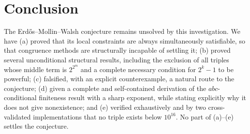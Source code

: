 \documentclass[11pt]{article}
\theoremstyle{definition}
\begin{document}
\section{Conclusion}

The Erdős--Mollin--Walsh conjecture remains unsolved by this investigation. We have
(a) proved that its local constraints are always simultaneously satisfiable, so that
congruence methods are structurally incapable of settling it; (b) proved several
unconditional structural results, including the exclusion of all triples whose middle
term is $2^{2^m}$ and a complete necessary condition for $2^k-1$ to be powerful;
(c) falsified, with an explicit counterexample, a natural route to the conjecture;
(d) given a complete and self-contained derivation of the $abc$-conditional finiteness
result with a sharp exponent, while stating explicitly why it does not give
nonexistence; and (e) verified exhaustively and by two cross-validated
implementations that no triple exists below $10^{16}$. No part of (a)--(e) settles the
conjecture.
\end{document}
